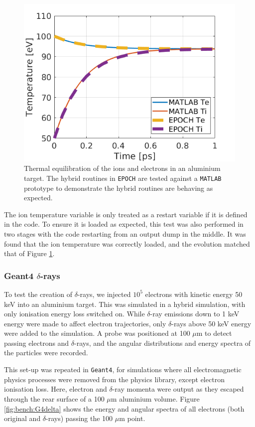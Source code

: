 \documentclass[12pt]{article}
\numberwithin{equation}{section}
\begin{document}
\begin{figure}
\centering
  \includegraphics[width=0.6\linewidth]{Figures/bench_equilibration.png}
\caption{Thermal equilibration of the ions and electrons in an aluminium target. The hybrid routines in \texttt{EPOCH} are tested against a \texttt{MATLAB} prototype to demonstrate the hybrid routines are behaving as expected.}
\label{fig:bench:equilibration}
\end{figure}

The ion temperature variable is only treated as a restart variable if it is defined in the code. To ensure it is loaded as expected, this test was also performed in two stages with the code restarting from an output dump in the middle. It was found that the ion temperature was correctly loaded, and the evolution matched that of Figure \ref{fig:bench:equilibration}.

\subsubsection{Geant4 $\delta$-rays} \label{sec:bench:G4_delta}

To test the creation of $\delta$-rays, we injected $10^5$ electrons with kinetic energy 50 keV into an aluminium target. This was simulated in a hybrid simulation, with only ionisation energy loss switched on. While $\delta$-ray emissions down to 1 keV energy were made to affect electron trajectories, only $\delta$-rays above 50 keV energy were added to the simulation. A probe was positioned at 100 $\mu$m to detect passing electrons and $\delta$-rays, and the angular distributions and energy spectra of the particles were recorded. 

This set-up was repeated in \texttt{Geant4}, for simulations where all electromagnetic physics processes were removed from the physics library, except electron ionisation loss. Here, electron and $\delta$-ray momenta were output as they escaped through the rear surface of a 100 $\mu$m aluminium volume. Figure \ref{fig:bench:G4delta}  shows the energy and angular spectra of all electrons (both original and $\delta$-rays) passing the 100 $\mu$m point.
\end{document}
